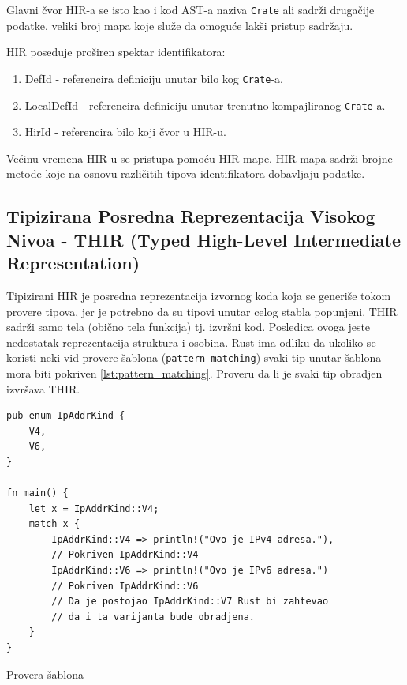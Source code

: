 \documentclass[11pt]{article}
\begin{document}
Glavni čvor HIR-a se isto kao i kod AST-a naziva \verb|Crate| ali sadrži drugačije podatke,
veliki broj mapa koje služe da omoguće lakši pristup sadržaju.

HIR poseduje proširen spektar identifikatora:
\begin{enumerate}
    \item DefId - referencira definiciju unutar bilo kog \verb|Crate|-a.
    \item LocalDefId - referencira definiciju unutar trenutno kompajliranog \verb|Crate|-a.
    \item HirId - referencira bilo koji čvor u HIR-u.
\end{enumerate}

Većinu vremena HIR-u se pristupa pomoću HIR mape. HIR mapa sadrži brojne metode 
koje na osnovu različitih tipova identifikatora dobavljaju podatke.

\newpage
\subsection{Tipizirana Posredna Reprezentacija Visokog Nivoa - THIR (Typed High-Level Intermediate Representation)}

Tipizirani HIR je posredna reprezentacija izvornog koda koja se generiše tokom provere tipova, jer je potrebno
da su tipovi unutar celog stabla popunjeni. THIR sadrži samo tela (obično tela funkcija) tj. izvršni kod.
Posledica ovoga jeste nedostatak reprezentacija struktura i osobina. 
Rust ima odliku da ukoliko se koristi neki vid provere šablona (\verb|pattern matching|) svaki tip unutar 
šablona mora biti pokriven \ref{lst:pattern_matching}. Proveru da li je svaki tip obradjen izvršava THIR.

\begin{listing}[H]
\begin{verbatim}
pub enum IpAddrKind {
    V4,
    V6,
}

fn main() {
    let x = IpAddrKind::V4;
    match x {
        IpAddrKind::V4 => println!("Ovo je IPv4 adresa."), 
        // Pokriven IpAddrKind::V4
        IpAddrKind::V6 => println!("Ovo je IPv6 adresa.") 
        // Pokriven IpAddrKind::V6
        // Da je postojao IpAddrKind::V7 Rust bi zahtevao 
        // da i ta varijanta bude obradjena.
    }
}
\end{verbatim}
\caption{Provera šablona}
\label{lst:pattern_matching}
\end{listing}
\end{document}
